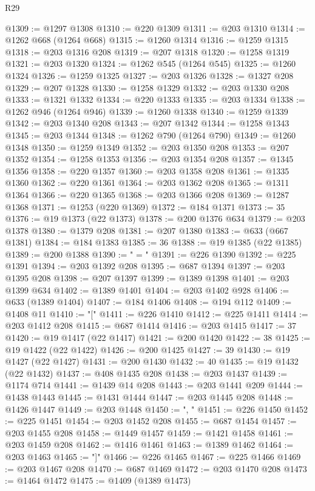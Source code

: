 \begin{lexlean}{R29}
\begin{coremodule}
@1309 := @1297 @1308
@1310 := @220 @1309
@1311 := @203 @1310
@1314 := @1262 @668 (@1264 @668)
@1315 := @1260 @1314
@1316 := @1259 @1315
@1318 := @203 @1316 @208
@1319 := @207 @1318
@1320 := @1258 @1319
@1321 := @203 @1320
@1324 := @1262 @545 (@1264 @545)
@1325 := @1260 @1324
@1326 := @1259 @1325
@1327 := @203 @1326
@1328 := @1327 @208
@1329 := @207 @1328
@1330 := @1258 @1329
@1332 := @203 @1330 @208
@1333 := @1321 @1332
@1334 := @220 @1333
@1335 := @203 @1334
@1338 := @1262 @946 (@1264 @946)
@1339 := @1260 @1338
@1340 := @1259 @1339
@1342 := @203 @1340 @208
@1343 := @207 @1342
@1344 := @1258 @1343
@1345 := @203 @1344
@1348 := @1262 @790 (@1264 @790)
@1349 := @1260 @1348
@1350 := @1259 @1349
@1352 := @203 @1350 @208
@1353 := @207 @1352
@1354 := @1258 @1353
@1356 := @203 @1354 @208
@1357 := @1345 @1356
@1358 := @220 @1357
@1360 := @203 @1358 @208
@1361 := @1335 @1360
@1362 := @220 @1361
@1364 := @203 @1362 @208
@1365 := @1311 @1364
@1366 := @220 @1365
@1368 := @203 @1366 @208
@1369 := @1287 @1368
@1371 := @1253 (@220 @1369)
@1372 := @184 @1371
@1373 := 35
@1376 := @19 @1373 (@22 @1373)
@1378 := @200 @1376 @634
@1379 := @203 @1378
@1380 := @1379 @208
@1381 := @207 @1380
@1383 := @633 (@667 @1381)
@1384 := @184 @1383
@1385 := 36
@1388 := @19 @1385 (@22 @1385)
@1389 := @200 @1388
@1390 := " = "
@1391 := @226 @1390
@1392 := @225 @1391
@1394 := @203 @1392 @208
@1395 := @687 @1394
@1397 := @203 @1395 @208
@1398 := @207 @1397
@1399 := @1389 @1398
@1401 := @203 @1399 @634
@1402 := @1389 @1401
@1404 := @203 @1402 @928
@1406 := @633 (@1389 @1404)
@1407 := @184 @1406
@1408 := @194 @112
@1409 := @1408 @11
@1410 := "["
@1411 := @226 @1410
@1412 := @225 @1411
@1414 := @203 @1412 @208
@1415 := @687 @1414
@1416 := @203 @1415
@1417 := 37
@1420 := @19 @1417 (@22 @1417)
@1421 := @200 @1420
@1422 := 38
@1425 := @19 @1422 (@22 @1422)
@1426 := @200 @1425
@1427 := 39
@1430 := @19 @1427 (@22 @1427)
@1431 := @200 @1430
@1432 := 40
@1435 := @19 @1432 (@22 @1432)
@1437 := @408 @1435 @208
@1438 := @203 @1437
@1439 := @1174 @714
@1441 := @1439 @14 @208
@1443 := @203 @1441 @209
@1444 := @1438 @1443
@1445 := @1431 @1444
@1447 := @203 @1445 @208
@1448 := @1426 @1447
@1449 := @203 @1448
@1450 := ", "
@1451 := @226 @1450
@1452 := @225 @1451
@1454 := @203 @1452 @208
@1455 := @687 @1454
@1457 := @203 @1455 @208
@1458 := @1449 @1457
@1459 := @1421 @1458
@1461 := @203 @1459 @208
@1462 := @1416 @1461
@1463 := @1389 @1462
@1464 := @203 @1463
@1465 := "]"
@1466 := @226 @1465
@1467 := @225 @1466
@1469 := @203 @1467 @208
@1470 := @687 @1469
@1472 := @203 @1470 @208
@1473 := @1464 @1472
@1475 := @1409 (@1389 @1473)

\end{coremodule}
\end{lexlean}
